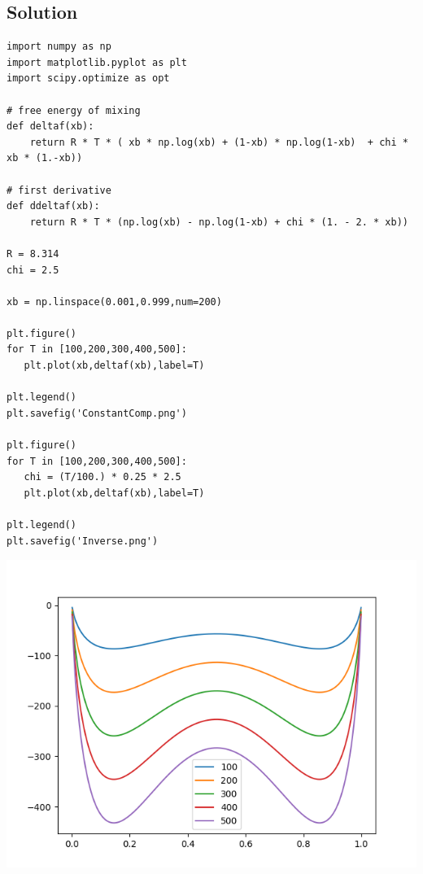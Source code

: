 \documentclass[11pt]{article}
\begin{document}
\subsection{Solution}
\label{sec:org042886b}
\begin{verbatim}
import numpy as np
import matplotlib.pyplot as plt
import scipy.optimize as opt

# free energy of mixing
def deltaf(xb):
    return R * T * ( xb * np.log(xb) + (1-xb) * np.log(1-xb)  + chi * xb * (1.-xb))

# first derivative
def ddeltaf(xb):
    return R * T * (np.log(xb) - np.log(1-xb) + chi * (1. - 2. * xb))

R = 8.314
chi = 2.5

xb = np.linspace(0.001,0.999,num=200)

plt.figure()
for T in [100,200,300,400,500]:
   plt.plot(xb,deltaf(xb),label=T)

plt.legend()
plt.savefig('ConstantComp.png')

plt.figure()
for T in [100,200,300,400,500]:
   chi = (T/100.) * 0.25 * 2.5
   plt.plot(xb,deltaf(xb),label=T)

plt.legend()
plt.savefig('Inverse.png')
\end{verbatim}

\begin{center}
\includegraphics[width=.9\linewidth]{./ConstantComp.png}
\end{center}
\end{document}
